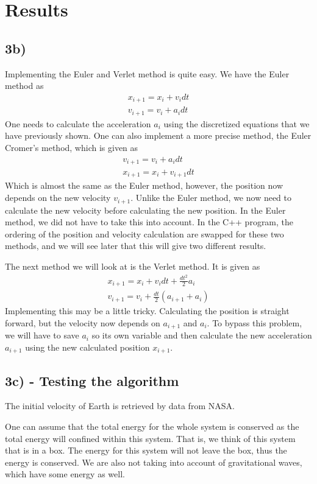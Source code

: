 \documentclass[12pt]{article}
\begin{document}
\section*{Results}
\subsection*{3b)}
Implementing the Euler and Verlet method is quite easy. We have the Euler method as
\begin{align*}
x_{i+1} = x_i + v_idt \\
v_{i+1} = v_i + a_idt
\end{align*}
One needs to calculate the acceleration $a_i$ using the discretized equations that we have previously shown. One can also implement a more precise method, the Euler Cromer's method, which is given as
\begin{align*}
v_{i+1} = v_i + a_idt \\
x_{i+1} = x_i + v_{i+1}dt
\end{align*}
Which is almost the same as the Euler method, however, the position now depends on the new velocity $v_{i+1}$. Unlike the Euler method, we now need to calculate the new velocity before calculating the new position. In the Euler method, we did not have to take this into account. In the C++ program, the ordering of the position and velocity calculation are swapped for these two methods, and we will see later that this will give two different results.

The next method we will look at is the Verlet method. It is given as
\begin{align*}
x_{i+1} = x_i + v_idt + \frac{dt^2}{2}a_i\\
v_{i+1} = v_i + \frac{dt}{2}\left(a_{i+1} + a_i \right)
\end{align*}
Implementing this may be a little tricky. Calculating the position is straight forward, but the velocity now depends on $a_{i+1}$ and $a_i$. To bypass this problem, we will have to save $a_i$ so its own variable and then calculate the new acceleration $a_{i+1}$ using the new calculated position $x_{i+1}$. 

\subsection*{3c) - Testing the algorithm}
The initial velocity of Earth is retrieved by data from NASA.

One can assume that the total energy for the whole system is conserved as the total energy will confined within this system. That is, we think of this system that is in a box. The energy for this system will not leave the box, thus the energy is conserved. We are also not taking into account of gravitational waves, which have some energy as well.
\end{document}
